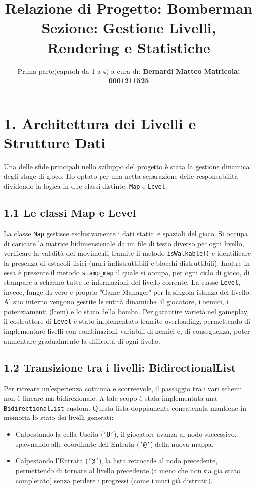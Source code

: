 \documentclass[11pt, a4paper]{article}
\title{Relazione di Progetto: Bomberman \\ \large Sezione: Gestione Livelli, Rendering e Statistiche}
\author{Prima parte(capitoli da 1 a 4) a cura di: \textbf{Bernardi Matteo Matricola: 0001211525}}
\date{}
\begin{document}
\maketitle

\section*{1. Architettura dei Livelli e Strutture Dati}
Una delle sfide principali nello sviluppo del progetto è stata la gestione dinamica degli stage di gioco. Ho optato per una netta separazione delle 
responsabilità dividendo la logica in due classi distinte: \texttt{Map} e \texttt{Level}.

\subsection*{1.1 Le classi Map e Level}
La classe \texttt{Map} gestisce esclusivamente i dati statici e spaziali del gioco. Si occupa di caricare la matrice bidimensionale da un file di testo 
diverso per ogni livello, verificare la validità dei movimenti tramite il metodo \texttt{isWalkable()} e identificare la presenza di ostacoli fisici (muri indistruttibili e blocchi distruttibili).
Inoltre in essa è presente il metodo \texttt{stamp\_map} il quale si occupa, per ogni ciclo di gioco, di stampare a schermo tutte le informazioni del livello corrente.
La classe \texttt{Level}, invece, funge da vero e proprio "Game Manager" per la singola istanza del livello. Al suo interno vengono gestite le entità dinamiche: 
il giocatore, i nemici, i potenziamenti (Item) e lo stato della bomba. Per garantire varietà nel gameplay, il costruttore di \texttt{Level} è stato 
implementato tramite overloading, permettendo di implementare livelli con combinazioni variabili di nemici e, di conseguenza, poter aumentare gradualmente la difficoltà di ogni livello.

\subsection*{1.2 Transizione tra i livelli: BidirectionalList}
Per ricreare un'esperienza cotninua e scorreevole, il passaggio tra i vari schemi non è lineare ma bidirezionale. A tale scopo è stata implementata 
una \texttt{BidirectionalList} custom. Questa lista doppiamente concatenata mantiene in memoria lo stato dei livelli generati:
\begin{itemize}
    \item Calpestando la cella Uscita (\texttt{'U'}), il giocatore avanza al nodo successivo, spawnando alle coordinate dell'Entrata (\texttt{'@'}) della nuova mappa.
    \item Calpestando l'Entrata (\texttt{'@'}), la lista retrocede al nodo precedente, permettendo di tornare al livello precedente (a meno che non sia gia stato completato) senza perdere i progressi (come i muri già distrutti).
\end{itemize}
\end{document}
